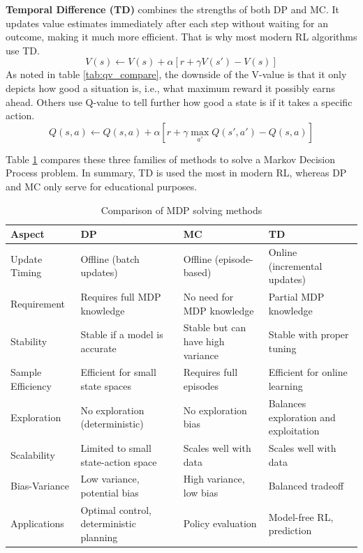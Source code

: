 \documentclass[../main.tex]{subfiles}
\begin{document}
\textbf{Temporal Difference (TD)} combines the strengths of both DP and MC. It updates value estimates immediately after each step without waiting for an outcome, making it much more efficient. That is why most modern RL algorithms use TD.
\begin{equation} \label{eq:tdv}
    V(s) \leftarrow V(s) + \alpha \left[ r + \gamma V(s') - V(s) \right]
\end{equation}
As noted in table \ref{tab:qv_compare}, the downside of the V-value is that it only depicts how good a situation is, i.e., what maximum reward it possibly earns ahead. Others use Q-value to tell further how good a state is if it takes a specific action.
\begin{equation} \label{eq:tdq}
    Q(s, a) \leftarrow Q(s, a) + \alpha \left[ r + \gamma \max_{a'} Q(s', a') - Q(s, a) \right]
\end{equation}

Table \ref{tab:mdp_solvers} compares these three families of methods to solve a Markov Decision Process problem. In summary, TD is used the most in modern RL, whereas DP and MC only serve for educational purposes.
\begin{table}[htb]
\centering
\caption{Comparison of MDP solving methods}
\begin{tabularx}{\textwidth}{lXXX}
    \toprule
    \textbf{Aspect} & \textbf{DP} & \textbf{MC} & \textbf{TD} \\
    \midrule
    Update Timing & Offline (batch updates) & Offline (episode-based) & Online (incremental updates) \\
    \hline
    Requirement & Requires full MDP knowledge & No need for MDP knowledge & Partial MDP knowledge \\
    \hline
    Stability & Stable if a model is accurate & Stable but can have high variance & Stable with proper tuning \\
    \hline
    Sample Efficiency & Efficient for small state spaces & Requires full episodes & Efficient for online learning \\
    \hline
    Exploration & No exploration (deterministic) & No exploration bias & Balances exploration and exploitation \\
    \hline
    Scalability & Limited to small state-action space & Scales well with data & Scales well with data \\
    \hline
    Bias-Variance & Low variance, potential bias & High variance, low bias & Balanced tradeoff \\
    \hline
    Applications & Optimal control, deterministic planning & Policy evaluation & Model-free RL, prediction \\
    \bottomrule
\end{tabularx}
\label{tab:mdp_solvers}
\end{table}
\end{document}
